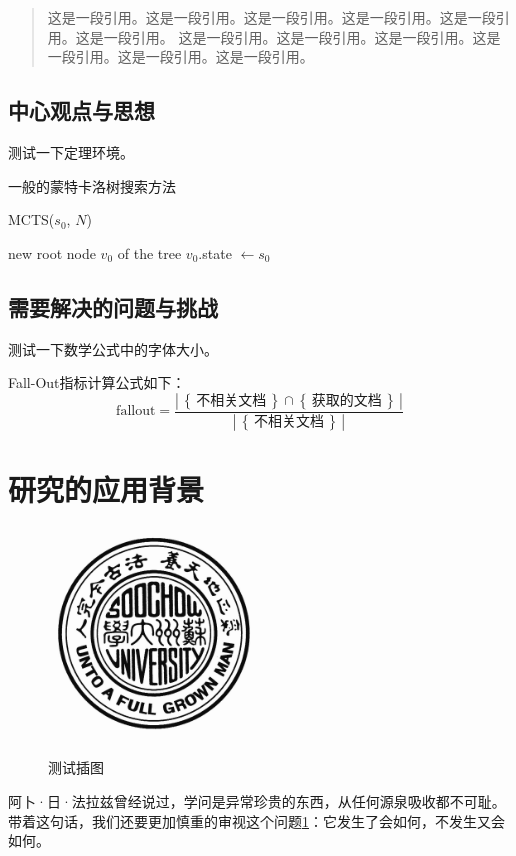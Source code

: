 \begin{quote}
这是一段引用。这是一段引用。这是一段引用。这是一段引用。这是一段引用。这是一段引用。
这是一段引用。这是一段引用。这是一段引用。这是一段引用。这是一段引用。这是一段引用。
\end{quote}




\subsection{中心观点与思想}

测试一下定理环境。

\begin{algorithm}[] \caption{一般的蒙特卡洛树搜索方法}\label{algo:raw_MCTS} %
    
    
    \Func MCTS($s_0$, $N$)
    
    
	 new root node $v_0$ of the tree\; 
	 $v_0$.state $\leftarrow s_0$ \;
	 
\end{algorithm}


\subsection{需要解决的问题与挑战}

测试一下数学公式中的字体大小。

\newcommand{\set}[1]{\left\{\,#1\,\right\}}
\newcommand{\card}[1]{\left|\,#1\,\right|}

Fall-Out指标计算公式如下：
\begin{equation*}
  \mbox{fallout} = \frac{\card{\set{\text{不相关文档}}\cap\set{\text{获取的文档}}}}{\card{\set{\text{不相关文档}}}}
\end{equation*}



\section{研究的应用背景}

\begin{figure}[htbp]
  \centering
  \includegraphics[width= 0.5\textwidth]{img/SchoolMark.jpg}\\
  \caption{测试插图}\label{fig:test1}
\end{figure}


阿卜·日·法拉兹曾经说过，学问是异常珍贵的东西，从任何源泉吸收都不可耻。带着这句话，我们还要更加慎重的审视这个问题\ref{fig:test1}：它发生了会如何，不发生又会如何。